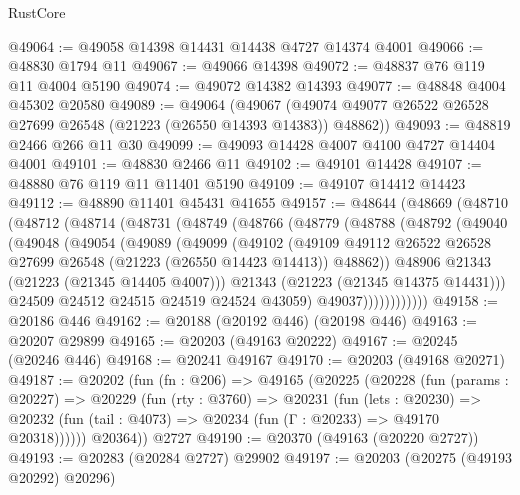 \begin{lexlean}{RustCore}
\begin{coremodule}
@49064 := @49058 @14398 @14431 @14438 @4727 @14374 @4001
@49066 := @48830 @1794 @11
@49067 := @49066 @14398
@49072 := @48837 @76 @119 @11 @4004 @5190
@49074 := @49072 @14382 @14393
@49077 := @48848 @4004 @45302 @20580
@49089 := @49064
    (@49067 (@49074 @49077 @26522 @26528 @27699 @26548 (@21223 (@26550 @14393 @14383)) @48862))
@49093 := @48819 @2466 @266 @11 @30
@49099 := @49093 @14428 @4007 @4100 @4727 @14404 @4001
@49101 := @48830 @2466 @11
@49102 := @49101 @14428
@49107 := @48880 @76 @119 @11 @11401 @5190
@49109 := @49107 @14412 @14423
@49112 := @48890 @11401 @45431 @41655
@49157 := @48644
    (@48669
      (@48710
        (@48712
          (@48714
            (@48731
              (@48749
                (@48766
                  (@48779
                    (@48788
                      (@48792
                        (@49040
                          (@49048
                            (@49054
                              (@49089
                                (@49099
                                  (@49102
                                    (@49109
                                      @49112
                                      @26522
                                      @26528
                                      @27699
                                      @26548
                                      (@21223 (@26550 @14423 @14413))
                                      @48862))
                                  @48906
                                  @21343
                                  (@21223 (@21345 @14405 @4007)))
                                @21343
                                (@21223 (@21345 @14375 @14431)))
                              @24509
                              @24512
                              @24515
                              @24519
                              @24524
                              @43059)
                            @49037))))))))))))
@49158 := @20186 @446
@49162 := @20188 (@20192 @446) (@20198 @446)
@49163 := @20207 @29899
@49165 := @20203 (@49163 @20222)
@49167 := @20245 (@20246 @446)
@49168 := @20241 @49167
@49170 := @20203 (@49168 @20271)
@49187 := @20202
    (fun (fn : @206) =>
    @49165
      (@20225
        (@20228
          (fun (params : @20227) =>
          @20229
            (fun (rty : @3760) =>
            @20231
              (fun (lets : @20230) =>
              @20232 (fun (tail : @4073) => @20234 (fun (Γ : @20233) => @49170 @20318))))))
        @20364))
    @2727
@49190 := @20370 (@49163 (@20220 @2727))
@49193 := @20283 (@20284 @2727) @29902
@49197 := @20203 (@20275 (@49193 @20292) @20296)

\end{coremodule}
\end{lexlean}
